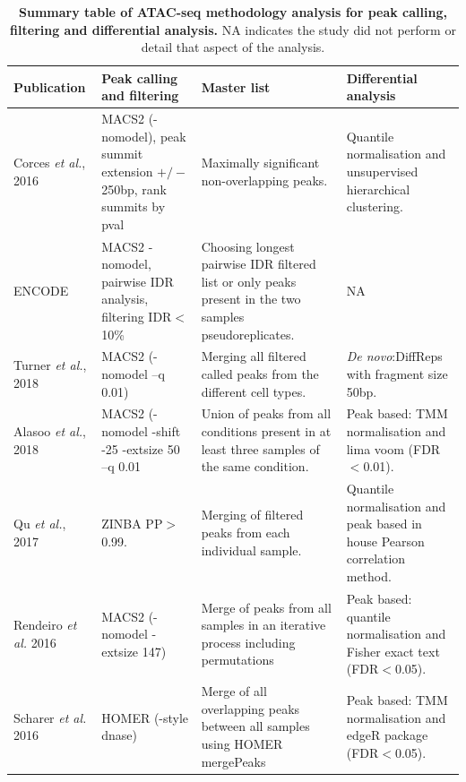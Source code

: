 \begin{landscape}
\begin{center}
\begin{longtable}[ht]{p{.20\textheight} p{.40\textheight} p{.40\textheight} p{.40\textheight}}
\caption[Summary table of ATAC-seq analysis methodology for peak calling, filtering and differential analysis.]{\textbf{Summary table of ATAC-seq methodology analysis for peak calling, filtering and differential analysis.} NA indicates the study did not perform or detail that aspect of the analysis.}
\label{tab:ATAC_comparative_methods} \\
\toprule
\textbf{Publication} & \textbf{Peak calling and filtering} & \textbf{Master list} & \textbf{Differential analysis} \\
\midrule
\midrule
Corces \textit{et al.}, 2016 & MACS2 (-nomodel), peak summit extension $+/-$250bp, rank summits by pval & Maximally significant non-overlapping peaks. & Quantile normalisation and unsupervised hierarchical clustering. \\
ENCODE  & MACS2 -nomodel, pairwise IDR analysis, filtering IDR$<$10\% & Choosing longest pairwise IDR filtered list or only peaks present in the two samples pseudoreplicates. & NA \\            
Turner \textit{et al.}, 2018 	& MACS2 (-nomodel --q 0.01) & Merging all filtered called peaks from the different cell types. & \textit{De novo}:DiffReps with fragment size 50bp. \\             																																						Alasoo \textit{et al.}, 2018 & MACS2 (-nomodel -shift -25 -extsize 50 --q 0.01 &	Union of peaks from all conditions present in at least three samples of the same condition. & Peak based: TMM normalisation and lima voom (FDR$<$0.01).\\ 
Qu \textit{et al.}, 2017 & ZINBA PP$>$0.99. & Merging of filtered peaks from each individual sample. & Quantile normalisation and peak based in house Pearson correlation method. \\							
Rendeiro \textit{et al.} 2016 & MACS2 (-nomodel -extsize 147)	& Merge of peaks from all samples in an iterative process including permutations & Peak based: quantile normalisation and Fisher exact text (FDR$<$0.05). \\
Scharer \textit{et al.} 2016 & HOMER (-style dnase) & Merge of all overlapping peaks between all samples using HOMER mergePeaks & Peak based: TMM normalisation and edgeR package (FDR$<$0.05). \\														   
\bottomrule
\end{longtable}
\end{center}
\end{landscape}


